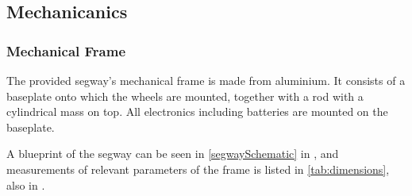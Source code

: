 %
%
%


\subsection{Mechanicanics}
\subsubsection{Mechanical Frame}

The provided segway's mechanical frame is made from aluminium. It consists of a baseplate onto which the wheels are mounted, together with a rod with a cylindrical mass on top. All electronics including batteries are mounted on the baseplate.

A blueprint of the segway can be seen in \autoref{segwaySchematic} in , and measurements of relevant parameters of the frame is listed in \autoref{tab:dimensions}, also in .




